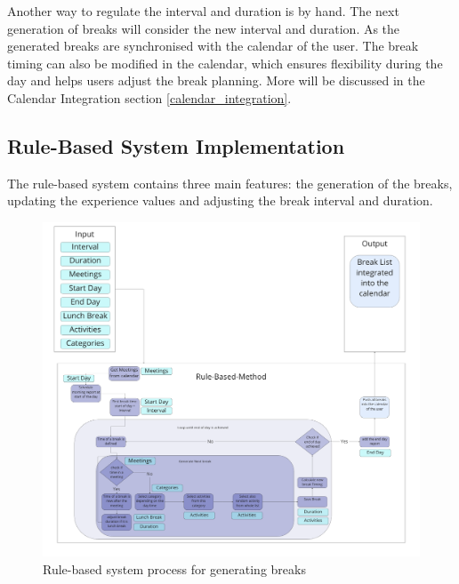 \documentclass{hasel_thesis}
\begin{document}
Another way to regulate the interval and duration is by hand. The next generation of breaks will consider the new interval and duration. As the generated breaks are synchronised with the calendar of the user. The break timing can also be modified in the calendar, which ensures flexibility during the day and helps users adjust the break planning. More will be discussed in the Calendar Integration section \ref{calendar_integration}.


\subsection{Rule-Based System Implementation} \label{rule-based-method-implementation}

The rule-based system contains three main features: the generation of the breaks, updating the experience values and adjusting the break interval and duration.

\begin{figure}[htp]
    \centering
    \includegraphics[width=15cm]{hasel_thesis/images/rule-based_method.png}
    \caption{Rule-based system process for generating breaks}
    \label{fig:rule-based_method}
\end{figure}
\end{document}
